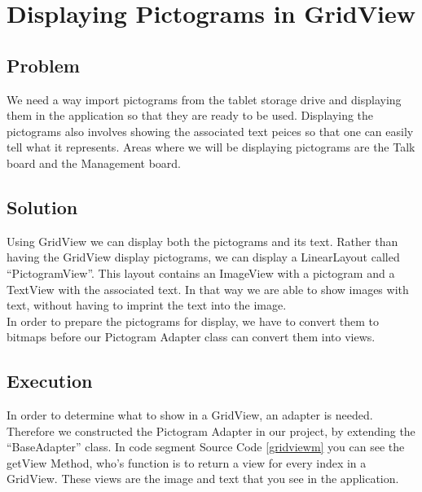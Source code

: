 \section{Displaying Pictograms in GridView} %
\label{disppict}

\subsection*{Problem}
We need a way import pictograms from the tablet storage drive and displaying them in the application so that they are ready to be used.
Displaying the pictograms also involves showing the associated text peices so that one can easily tell what it represents.
Areas where we will be displaying pictograms are the Talk board and the Management board.

\subsection*{Solution}
Using GridView we can display both the pictograms and its text.
Rather than having the GridView display pictograms, we can display a LinearLayout called ``PictogramView''.
This layout contains an ImageView with a pictogram and a TextView with the associated text.
In that way we are able to show images with text, without having to imprint the text into the image.\\

In order to prepare the pictograms for display, we have to convert them to bitmaps before our Pictogram Adapter class can convert them into views.

\subsection*{Execution}
In order to determine what to show in a GridView, an adapter is needed. Therefore we constructed the Pictogram Adapter in our project, by extending the ``BaseAdapter'' class.
In code segment Source Code \ref{gridviewm} you can see the getView Method, who's function is to return a view for every index in a GridView.
These views are the image and text that you see in the application.\\


